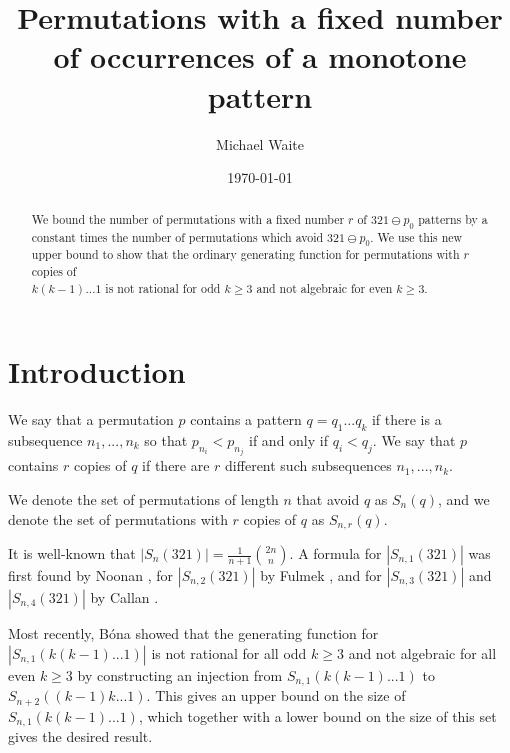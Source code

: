 \documentclass[11pt]{amsart}
\date{\today}
\theoremstyle{remark}
\numberwithin{equation}{section}
\begin{document}
\title[Fixed number of occurrences of a monotone pattern]{Permutations with a fixed number of occurrences of a monotone pattern}
\author {Michael Waite}
\address{Department of Mathematics, University of Florida, Gainesville, FL 32601}




\begin{abstract} 
We bound the number of permutations with a fixed number $r$ of $321\ominus p_0$ patterns by a constant times the number of permutations which avoid $321 \ominus p_0$. We use this new upper bound to show that the ordinary generating function for permutations with $r$ copies of \\ $k(k-1)...1$ is not rational for odd $k\geq 3$ and not algebraic for even $k\geq 3$.
\end{abstract}



\maketitle

\section{Introduction}
We say that a permutation $p$ contains a pattern $q = q_1 ... q_k$ if there is a subsequence $n_1, ..., n_k$ so that $p_{n_i} < p_{n_j}$ if and only if $q_i < q_j$. We say that $p$ contains $r$ copies of $q$ if there are $r$ different such subsequences $n_1, ..., n_k$.

We denote the set of permutations of length $n$ that avoid $q$ as $S_n(q)$, and we denote the set of permutations with $r$ copies of $q$ as $S_{n,r}(q)$.

It is well-known that $|S_n(321)| = \frac{1}{n+1} {2n \choose n}$. A formula for $|S_{n,1}(321)|$ was first found by Noonan \cite{Noonan}, for $|S_{n,2}(321)|$ by Fulmek \cite{Fulmek}, and for $|S_{n,3}(321)|$ and $|S_{n,4}(321)|$ by Callan \cite{Callan}.

Most recently, Bóna \cite{Bona} showed that the generating function for  \\ $|S_{n,1}(k(k-1)...1)|$ is not rational for all odd $k\geq 3$ and not algebraic for all even $k\geq 3$ by constructing an injection from $S_{n,1}(k(k-1)...1)$ to \\ $S_{n+2}((k-1)k...1)$. This gives an upper bound on the size of $S_{n,1}(k(k-1)...1)$, which together with a lower bound on the size of this set gives the desired result.
\end{document}
